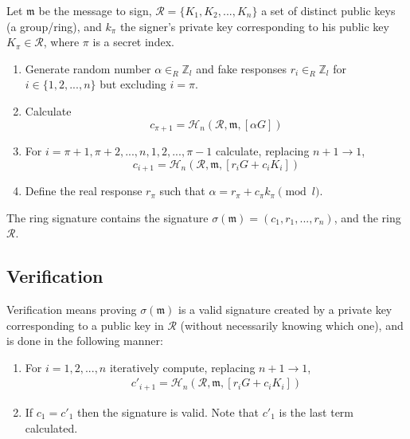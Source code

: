 Let \(\mathfrak{m}\) be the message to sign, \(\mathcal{R} = \{K_1, K_2, ..., K_n\}\) a set of distinct public keys (a group/ring), and \(k_\pi\) the signer's private key corresponding to his public key \(K_\pi \in \mathcal{R}\), where $\pi$ is a secret index.

\begin{enumerate}
	\item Generate random number \(\alpha \in_R \mathbb{Z}_l\) and fake responses  \(r_i \in_R \mathbb{Z}_l\) for \(i \in \{1, 2, ..., n\}\) but excluding \(i = \pi\).

	\item Calculate
	\[c_{\pi+1} = \mathcal{H}_n(\mathcal{R}, \mathfrak{m}, [\alpha G])\]

	\item For \(i = \pi+1, \pi+2, ..., n, 1, 2, ..., \pi-1\) calculate, replacing \(n + 1 \rightarrow 1\),\vspace{.175cm}
	\[  c_{i+1} = \mathcal{H}_n(\mathcal{R}, \mathfrak{m}, [r_i G + c_i K_i])\] 

	\item Define the real response $r_\pi$ such that \(\alpha = r_\pi + c_\pi k_\pi \pmod l\).
\end{enumerate}

The ring signature contains the signature \(\sigma(\mathfrak{m}) = (c_1, r_1, ..., r_n) \), and the ring $\mathcal{R}$.


\subsection*{Verification}

Verification means proving $\sigma(\mathfrak{m})$ is a valid signature created by a private key corresponding to a public key in $\mathcal{R}$ (without necessarily knowing which one), and is done in the following manner:

\begin{enumerate}
	\item For \(i = 1, 2, ..., n\) iteratively compute, replacing \(n + 1 \rightarrow 1\),\vspace{.175cm}
	\begin{align*}
	c'_{i+1}   = \mathcal{H}_n(\mathcal{R}, \mathfrak{m}, [r_i G + c_i {K_i}])
	\end{align*}

	\item If \(c_1 = c'_1\) then the signature is valid. Note that $c'_1$ is the last term calculated.
\end{enumerate}

